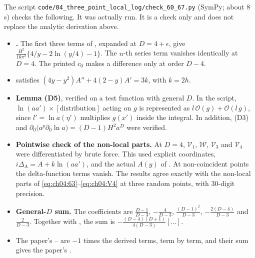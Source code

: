 The script \texttt{code/04\_three\_point\_local\_log/check\_60\_67.py} (SymPy; about 8\,s) checks the following.
It was actually run.
It is a check only and does not replace the analytic derivation above.
\begin{itemize}[leftmargin=1.2em,itemsep=3pt]
\item[(a)] \textbf{.} The first three terms of , expanded at $D=4+\epsilon$, give $\frac{H^2}{16\pi^2}\{4/y-2\ln(y/4)-1\}$.
The $n$-th series term vanishes identically at $D=4$.
The printed $c_0$ makes a difference only at order $D-4$.
\item[(b)]  satisfies $(4y-y^2)A''+4(2-y)A'=3k$, with $k=2h$.
\item[(c)] \textbf{Lemma (D5)}, verified on a test function with general $D$.
In the script, $\ln(aa')\times[\text{distribution}]$ acting on $g$ is represented as $l\,\mathcal O(g)+\mathcal O(l\,g)$, since $l'=\ln a(\eta')$ multiplies $g(x')$ inside the integral.
In addition, (D3) and $\partial_0\big(a^p\partial_0\ln a\big)=(D-1)H^2a^D$ were verified.
\item[(d)] \textbf{Pointwise check of the non-local parts.}
At $D=4$, $\mathcal V_1$, $\mathcal W$, $\mathcal V_3$ and $\mathcal V_4$ were differentiated by brute force.
This used explicit coordinates, $i\Delta_A=A+k\ln(aa')$, and the actual $A(y)$ of .
At non-coincident points the delta-function terms vanish.
The results agree exactly with the non-local parts of \eqref{eq:ch04:63}--\eqref{eq:ch04:V4} at three random points, with 30-digit precision.
\item[(e)] \textbf{General-$D$ sum.} The coefficients are $\frac{D-1}{D-3}$, $-\frac4{D-3}$, $\frac{(D-1)^2}{D-3}$, $-\frac{2(D-4)}{D-3}$ and $\frac2{D-3}$.
Together with , the sum is $-\frac{(D-4)(D+1)}{4(D-3)}[\ldots]$.
\item[(f)] The paper's -- are $-1$ times the derived terms, term by term, and their sum gives the paper's .
\end{itemize}

